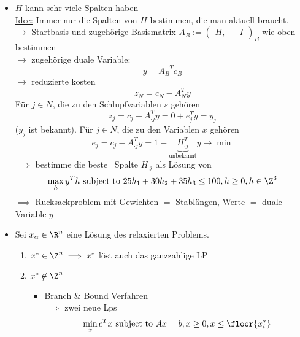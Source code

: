 \begin{beispiel}
\begin{enumerate}
\begin{itemize}
		\item $H$ kann sehr viele Spalten haben\\
			\underline{Idee:} Immer nur die Spalten von $H$ bestimmen, die man aktuell braucht.\\
			$\to$ Startbasis und zugehörige Basismatrix $A_{B} := \begin{pmatrix}
				H,&-I
			\end{pmatrix}_{B}
			$ wie oben bestimmen\\
			$\to$ zugehörige duale Variable: 
			\begin{equation*}
				y = A_{B}^{-T}c_{B}
			\end{equation*}
			$\to $ reduzierte kosten 
			\begin{equation*}
				z_{N} = c_{N} - A_{N}^{T} y
			\end{equation*}
			Für $j \in N$, die zu den Schlupfvariablen $s$ gehören
			\begin{equation*}
				z_{j} = c_{j} - A_{\cdot j}^{T} y = 0 + e_{j}^{T} y = y_{j}
			\end{equation*}
			($y_{j}$ ist bekannt). Für $j \in N$, die zu den Variablen $x$ gehören 
			\begin{equation*}\label{dantzigRegel}
				e_{j} = c_{j} - A_{\cdot j}^{T} y = 1 - \underbrace{H_{\cdot j}^{T}}_{\text{unbekannt}} y \to \min \tag{Dantzig Regel} 
			\end{equation*}
			$\implies$ bestimme die \glqq beste \grqq\ Spalte $H_{\cdot j}$ als Lösung von 
			\begin{equation*}
				\max_{h} y^{T} h \text{ subject to } 25h_{1} + 30 h_{2} + 35h_{3} \leq 100, h\geq 0 , h \in \Z^3
			\end{equation*}
			$\implies$ Rucksackproblem mit Gewichten $=$ Stablängen, Werte $=$ duale Variable $y$
		\item Sei $x_{\alpha} \in \R^n$ eine Lösung des relaxierten Problems.
			\begin{enumerate}[label = \arabic*. Fall:]
				\item $x^* \in \Z^n \implies x^*$ löst auch das ganzzahlige LP
				\item $x^* \not \in \Z^n$
					\begin{itemize}
					\item Branch & Bound Verfahren \\
					$\implies$ zwei neue Lps
					\begin{align*}
						\min_{x} c^{T} &x \text{ subject to } Ax = b , x\geq 0 , x\leq \floor{x_{i}^*}\\

\end{align*}
\end{itemize}
\end{enumerate}
\end{itemize}
\end{enumerate}
\end{beispiel}
